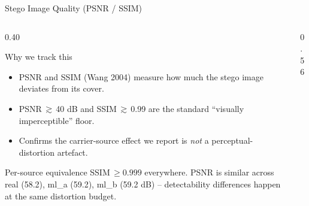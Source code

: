 \documentclass[aspectratio=169,11pt]{beamer}
\begin{document}
\begin{frame}{Stego Image Quality (PSNR / SSIM)}
\scriptsize
\begin{columns}[T]
\begin{column}{0.40\textwidth}
\begin{block}{Why we track this}
\begin{itemize}\setlength{\itemsep}{1pt}
\item PSNR and SSIM (Wang 2004) measure how much the stego image deviates from its cover.
\item PSNR\,$\gtrsim$\,40 dB and SSIM\,$\gtrsim$\,0.99 are the standard ``visually imperceptible'' floor.
\item Confirms the carrier-source effect we report is \emph{not} a perceptual-distortion artefact.
\end{itemize}
\end{block}
\begin{exampleblock}{Per-source equivalence}
SSIM\,$\geq\!0.999$ everywhere. PSNR is similar across real (58.2), ml\_a (59.2), ml\_b (59.2 dB) -- detectability differences happen at the same distortion budget.
\end{exampleblock}
\end{column}
\begin{column}{0.56\textwidth}
\begin{center}
\end{center}
\end{column}
\end{columns}
\end{frame}
\end{document}
